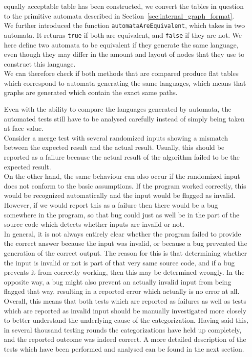 \documentclass[a4paper,12pt,twoside,BCOR=10mm]{scrbook}
\begin{document}
equally acceptable table has been constructed, we convert the tables in question to the
primitive automata described in Section~\ref{sec:internal_graph_format}. \\
We further introduced the function \texttt{automataAreEquivalent}, which
takes in two automata. It returns \texttt{true} if both are equivalent,
and \texttt{false} if they are not. We here define two automata to be
equivalent if they generate the same language, even though they may differ
in the amount and layout of nodes that they use to construct this language. \\
We can therefore check if both methods that are compared produce flat tables
which correspond to automata generating the same languages, which means
that graphs are generated which contain the exact same paths.

Even with the ability to compare the languages generated by automata,
the automated tests still have to be analysed carefully instead of
simply being taken at face value. \\
Consider a merge test with several randomized inputs showing a mismatch
between the expected result and the actual result.
Usually, this should be reported as a failure because the actual result of the algorithm
failed to be the expected result. \\
On the other hand, the same behaviour can also occur if the randomized input
does not conform to the basic assumptions. If the program worked correctly,
this would be recognized automatically and the input would be flagged as invalid.
However, if we would report this as a failure then there would be a bug somewhere
in the program, so that bug could just as well be in the part of the source code
which detects whether inputs are invalid or not. \\
In general, it is not always entirely clear whether the program failed to provide the correct answer
because the input was invalid, or because a bug prevented the generation of the correct output.
The reason for this is that determining whether the input is invalid or not is part of that
very same source code, and if a bug prevents it from correctly working, then this may be determined
wrongly. In the opposite way, a bug might also prevent an actually invalid input from being
flagged that way, resulting in a reported error which actually is no error at all. \\
Overall, this means that both tests which are reported as failures as well as tests which are reported as invalid input
should be manually investigated more closely to
better understand the underlying cause of the categorization.
Having said this, in several thousand testing rounds the categorizations have held up completely,
and the reported outcome was indeed correct. A more detailed description of the tests which have been performed
and analysed can be found in the next section.
\end{document}
